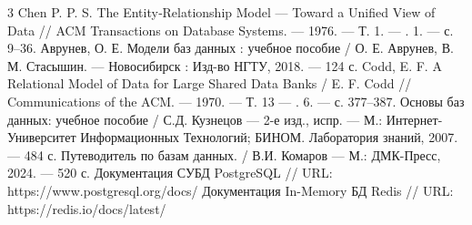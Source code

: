 
\begin{thebibliography}{3}
	 Chen P. P. S. The Entity‑Relationship Model --- Toward a Unified View of Data \newline// ACM Transactions on Database Systems. --- 1976. --- Т. 1. --- \textnumero. 1. --- с. 9–36.
	Аврунев, О. Е. Модели баз данных : учебное пособие / О. Е. Аврунев, В. М. Стасышин. --- Новосибирск : Изд-во НГТУ, 2018. --- 124 с.
	Codd, E. F. A Relational Model of Data for Large Shared Data Banks / E. F. Codd // Communications of the ACM. --- 1970. --- Т. 13 --- \textnumero. 6. --- с. 377–387.
	 Основы баз данных: учебное пособие / С.Д. Кузнецов --- 2-е изд., испр. --- М.: Интернет-Университет Информационных Технологий; БИНОМ. Лаборатория знаний, 2007. --- 484 с.
	 Путеводитель по базам данных. / В.И. Комаров --- М.: ДМК-Пресс, 2024. --- 520 с.
	 Документация СУБД PostgreSQL // URL: https://www.postgresql.org/docs/
	 Документация In-Memory БД Redis // URL: https://redis.io/docs/latest/
\end{thebibliography}

